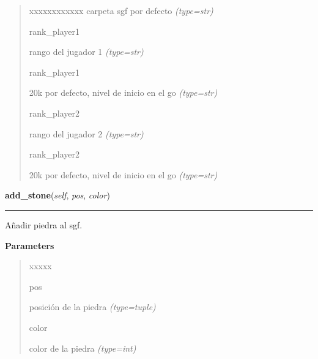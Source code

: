\begin{boxedminipage}{\funcwidth}
\begin{quote}
\begin{Ventry}{xxxxxxxxxxxx}
carpeta sgf por defecto
            {\it (type=str)}

          \item[rank\_player1]


rango del jugador 1
            {\it (type=str)}

          \item[rank\_player1]


20k por defecto, nivel de inicio en el go
            {\it (type=str)}

          \item[rank\_player2]


rango del jugador 2
            {\it (type=str)}

          \item[rank\_player2]


20k por defecto, nivel de inicio en el go
            {\it (type=str)}

        \end{Ventry}

      \end{quote}

    \end{boxedminipage}

    \label{src:kifu:Kifu:add_stone}

    \vspace{0.5ex}

\hspace{.8\funcindent}\begin{boxedminipage}{\funcwidth}

    \raggedright \textbf{add\_stone}(\textit{self}, \textit{pos}, \textit{color})

    \vspace{-1.5ex}

    \rule{\textwidth}{0.5\fboxrule}
\setlength{\parskip}{2ex}
Añadir piedra al sgf.

\setlength{\parskip}{1ex}
      \textbf{Parameters}
      \vspace{-1ex}

      \begin{quote}
        \begin{Ventry}{xxxxx}

          \item[pos]


posición de la piedra
            {\it (type=tuple)}

          \item[color]


color de la piedra
            {\it (type=int)}

        \end{Ventry}

      \end{quote}

    \end{boxedminipage}

